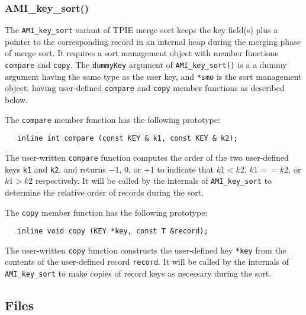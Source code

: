 
\subsubsection{AMI\_key\_sort()}

The \lstinline|AMI_key_sort| variant of TPIE merge sort keeps
the key field(s) plus a pointer to the corresponding record
in an internal heap during the merging phase of merge sort.
It requires a sort management object with member functions
\lstinline|compare| and \lstinline|copy|.
The \lstinline|dummyKey| argument of \lstinline|AMI_key_sort()| is a a
dummy argument having the same type as the user key, and
\lstinline|*smo| is the sort management
object, having user-defined \lstinline|compare| and
\lstinline|copy| member functions as described below.

The \lstinline|compare| member function has the following
prototype:
\begin{lstlisting}
   inline int compare (const KEY & k1, const KEY & k2);
\end{lstlisting}

The user-written \lstinline|compare| function computes the
order of the two user-defined keys \lstinline|k1| and
\lstinline|k2|, and returns $-1$, $0$, or $+1$ to indicate that
$k1<k2$, $k1==k2$, or $k1>k2$ respectively.
It will be called by the internals of \lstinline|AMI_key_sort| to
determine the relative order of records during the sort.

The \lstinline|copy| member function has the following
prototype:
\begin{lstlisting}
   inline void copy (KEY *key, const T &record);
\end{lstlisting}

The user-written \lstinline|copy| function constructs the
user-defined key \lstinline|*key| from the contents of the
user-defined record \lstinline|record|. It will be called by the
internals of \lstinline|AMI_key_sort| to make copies of record
keys as necessary during the sort.



\subsection{Files}
  \btabb
         {}
  \etabb

